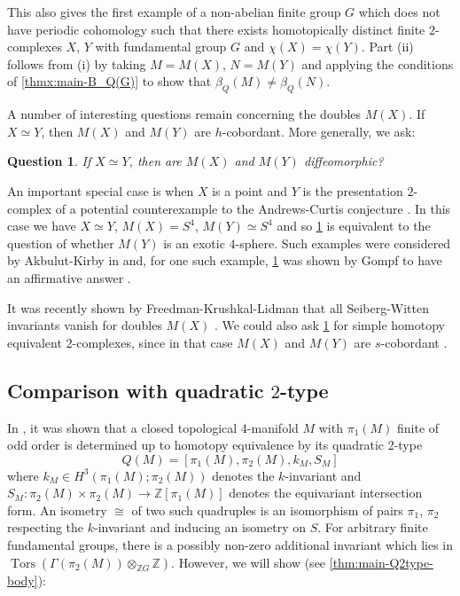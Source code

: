 \documentclass[11pt,a4paper,leqno]{amsart}
\newtheorem{question}[theorem]{Question}
\theoremstyle{definition}
\theoremstyle{remark}
\newcommand{\Z}{\mathbb{Z}}
\DeclareMathOperator{\Tors}{Tors}
\begin{document}
This also gives the first example of a non-abelian finite group $G$ which does not have periodic cohomology such that there exists homotopically distinct finite $2$-complexes $X$, $Y$ with fundamental group $G$ and $\chi(X)=\chi(Y)$.
Part (ii) follows from (i) by taking $M = M(X)$, $N = M(Y)$ and applying the conditions of \cref{thmx:main-B_Q(G)} to show that $\beta_Q(M) \neq \beta_Q(N)$.

A number of interesting questions remain concerning the doubles $M(X)$.
If $X \simeq Y$, then $M(X)$ and $M(Y)$ are $h$-cobordant.
More generally, we ask: 

\begin{question} \label{question:diffeo}
If $X\simeq Y$, then are $M(X)$ and $M(Y)$ diffeomorphic?
\end{question}

An important special case is when $X$  is a point and $Y$ is the presentation $2$-complex of a potential counterexample to the Andrews-Curtis conjecture \cite{AC65}. In this case we have $X \simeq Y$, $M(X) = S^4$, $M(Y) \simeq S^4$ and so \cref{question:diffeo} is equivalent to the question of whether $M(Y)$ is an exotic $4$-sphere.
Such examples were considered by Akbulut-Kirby in \cite{AK85} and, for one such example, \cref{question:diffeo} was shown by Gompf to have an affirmative answer \cite{Go91}.

It was recently shown by Freedman-Krushkal-Lidman that all Seiberg-Witten invariants vanish for doubles $M(X)$ \cite[Proposition 1.3]{Freedman:2024}.
We could also ask \cref{question:diffeo} for simple homotopy equivalent $2$-complexes,  since in that case $M(X)$ and $M(Y)$ are $s$-cobordant \cite[p15]{Kreck:1984}.

\subsection{Comparison with quadratic $2$-type}

In \cite{Hambleton:1988,Ba88}, it was shown that a closed topological 4-manifold $M$ with $\pi_1(M)$ finite of odd order is determined up to homotopy equivalence by its quadratic 2-type 
\[ Q(M) = [\pi_1(M), \pi_2(M), k_M, S_M] \]
where $k_M \in H^3(\pi_1(M);\pi_2(M))$ denotes the $k$-invariant and $S_M\colon  \pi_2(M) \times \pi_2(M) \to \Z[\pi_1(M)]$ denotes the equivariant intersection form. 
An isometry $\cong$ of two such quadruples is an isomorphism of pairs $\pi_1$, $\pi_2$ respecting the $k$-invariant and inducing an isometry on $S$.
For arbitrary finite fundamental groups, there is a possibly non-zero additional invariant which lies in $\Tors(\Gamma(\pi_2(M)) \otimes_{\Z G} \Z)$. 
However, we will show (see \cref{thm:main-Q2type-body}):
\end{document}
